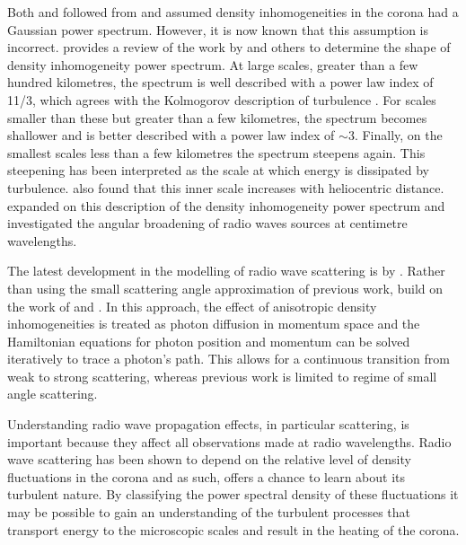 Both \cite{Fokker1965} and \cite{Steinberg1971} followed from \cite{Chandrasekhar1952} and assumed density inhomogeneities in the corona had a Gaussian power spectrum. However, it is now known that this assumption is incorrect. \cite{Bastian1994} provides a review of the work by \cite{Coles1989} and others to determine the shape of density inhomogeneity power spectrum. At large scales, greater than a few hundred kilometres, the spectrum is well described with a power law index of 11/3, which agrees with the Kolmogorov description of turbulence \citep{Kolmogorov1941}. For scales smaller than these but greater than a few kilometres, the spectrum becomes shallower and is better described with a power law index of $\sim 3$. Finally, on the smallest scales less than a few kilometres the spectrum steepens again. This steepening has been interpreted as the scale at which energy is dissipated by turbulence. \cite{Coles1989} also found that this inner scale increases with heliocentric distance. \cite{Bastian1994} expanded on this description of the density inhomogeneity power spectrum and investigated the angular broadening of radio waves sources at centimetre wavelengths.

The latest development in the modelling of radio wave scattering is by \cite{Kontar2019}. Rather than using the small scattering angle approximation of previous work, \cite{Kontar2019} build on the work of \cite{Arzner1999} and \cite{Bian2019}. In this approach, the effect of anisotropic density inhomogeneities is treated as photon diffusion in momentum space and the Hamiltonian equations for photon position and momentum can be solved iteratively to trace a photon's path. This allows for a continuous transition from weak to strong scattering, whereas previous work is limited to regime of small angle scattering. 

Understanding radio wave propagation effects, in particular scattering, is important because they affect all observations made at radio wavelengths. Radio wave scattering has been shown to depend on the relative level of density fluctuations in the corona and as such, offers a chance to learn about its turbulent nature. By classifying the power spectral density of these fluctuations it may be possible to gain an understanding of the turbulent processes that transport energy to the microscopic scales and result in the heating of the corona. 

